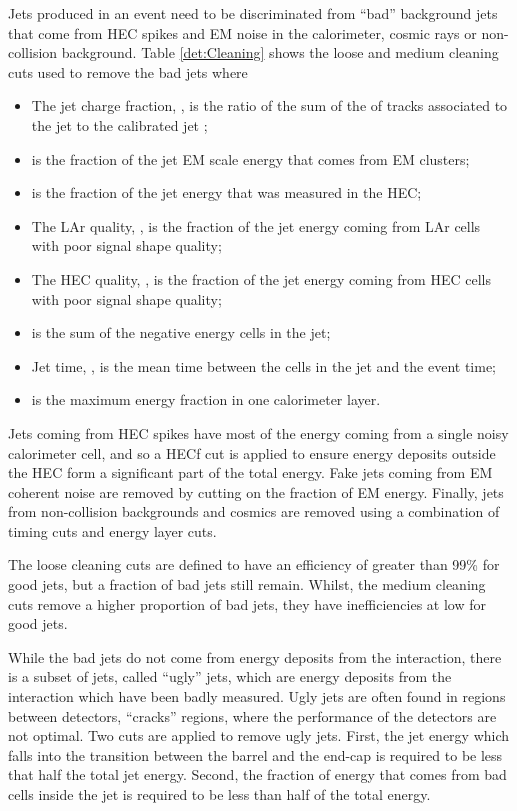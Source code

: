 Jets produced in an event need to be discriminated from ``bad'' background jets that come from  HEC spikes and EM noise in the calorimeter, cosmic rays or non-collision background.
Table \ref{det:Cleaning} shows the loose and medium cleaning cuts used to remove the bad jets where
\begin{itemize}
  \item The jet charge fraction, , is the ratio of the sum of the \pt{} of tracks associated to the jet to the calibrated jet \pt{};
  \item {} is the fraction of the jet EM scale energy that comes from EM clusters;
  \item {} is the fraction of the jet energy that was measured in the HEC;
  \item The LAr quality, , is the fraction of the jet energy coming from LAr cells with poor signal shape quality;
  \item The HEC quality, , is the fraction of the jet energy coming from HEC cells with poor signal shape quality;
  \item {} is the sum of the negative energy cells in the jet;
  \item Jet time, , is the mean time between the cells in the jet and the event time;
  \item {} is the maximum energy fraction in one calorimeter layer.
\end{itemize}

Jets coming from HEC spikes have most of the energy coming from a single noisy calorimeter cell, and so a HECf cut is applied to ensure energy deposits outside the HEC form a significant part of the total energy.
Fake jets coming from EM coherent noise are removed by cutting on the fraction of EM energy.
Finally, jets from non-collision backgrounds and cosmics are removed using a combination of timing cuts and energy layer cuts.

The loose cleaning cuts are defined to have an efficiency of greater than 99\% for good jets, but a fraction of bad jets still remain. 
Whilst, the medium cleaning cuts remove a higher proportion of bad jets, they have inefficiencies at low \pt{} for good jets. 

While the bad jets do not come from energy deposits from the interaction, there is a subset of jets, called ``ugly'' jets, which are energy deposits from the interaction which have been badly measured. 
Ugly jets are often found in regions between detectors, ``cracks'' regions, where the performance of the detectors are not optimal.
Two cuts are applied to remove ugly jets.
First, the jet energy which falls into the transition between the barrel and the end-cap is required to be less that half the total jet energy.
Second, the fraction of energy that comes from bad cells inside the jet is required to be less than half of the total energy.


